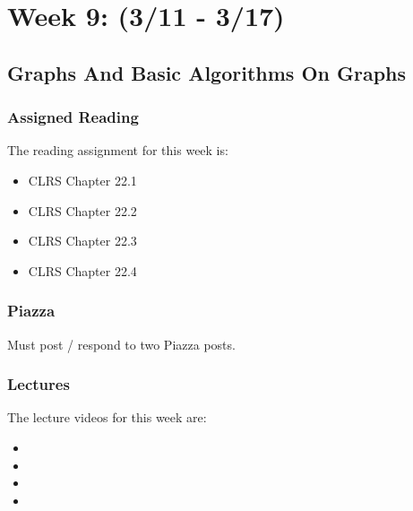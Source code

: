 \clearpage

\renewcommand{\ChapTitle}{Week 9: (3/11 - 3/17)}
\renewcommand{\SectionTitle}{Graphs And Basic Algorithms On Graphs}

\chapter{\ChapTitle}

\section{\SectionTitle}

\subsection{Assigned Reading}

The reading assignment for this week is:

\begin{itemize}
    \item CLRS Chapter 22.1
    \item CLRS Chapter 22.2
    \item CLRS Chapter 22.3
    \item CLRS Chapter 22.4
\end{itemize}

\subsection{Piazza}

Must post / respond to two Piazza posts. 

\subsection{Lectures}

The lecture videos for this week are:

\begin{itemize}
    \item {}
    \item {}
    \item {}
    \item {}
\end{itemize}

